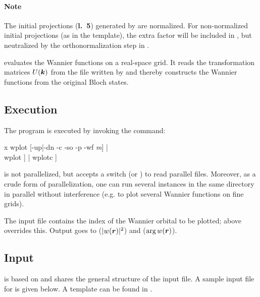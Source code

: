 \paragraph{Note} The initial projections (\textbf{l.~5}) generated by
\writeinwf are normalized.  For non-normalized initial projections (as
in the template), the extra factor will be included in
, but neutralized by the orthonormalization step in
\wannier.



\wplot evaluates the Wannier functions on a real-space grid.  It reads
the transformation matrices $U(\boldsymbol k)$ from the file 
written by \wannierx and thereby constructs the Wannier functions from
the original \wien Bloch states.

\subsection{Execution}

The program \wplot is executed by invoking the command:
%
\begin{usage}
  x wplot [-up|-dn -c -so -p -wf \textit{m}]   |
  \\
  wplot  \deffile [\textit{m} [\#proc]] |
  wplotc \deffile [\textit{m} [\#proc]]
\end{usage}
%
\wplot is not parallelized, but accepts a  switch (or
) to read parallel  files.  Moreover, as a
crude form of parallelization, one can run several \wplot instances in
the same directory in parallel without interference (e.g. to plot
several Wannier functions on fine grids).

The input file contains the index of the Wannier orbital to be
plotted;  above overrides this.  Output goes to
 ($|w(\boldsymbol r)|^2$) and
 ($\arg w(\boldsymbol r)$).

\subsection{Input}

\wplot is based on  and shares the general structure of
the input file.  A sample input file for  is given below.
A template can be found in
.
%
%

